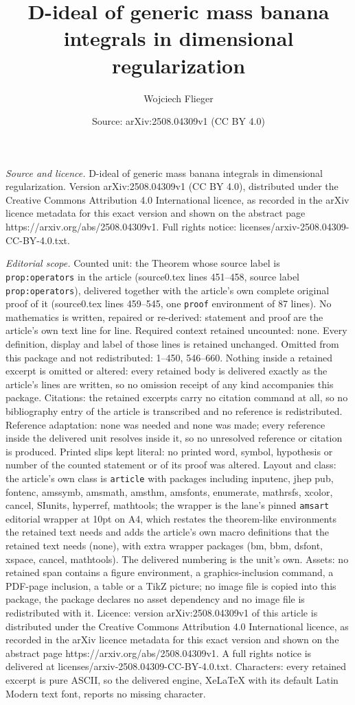 \documentclass[10pt,a4paper]{amsart}
\title[D-ideal of generic mass banana integrals in dimensional regu]{D-ideal of generic mass banana integrals in dimensional regularization}
\author{Wojciech Flieger}
\date{Source: arXiv:2508.04309v1 (CC BY 4.0)}
\begin{document}
\maketitle

\noindent\emph{Source and licence.} D-ideal of generic mass banana integrals in dimensional regularization. Version arXiv:2508.04309v1 (CC BY 4.0), distributed under the Creative Commons Attribution 4.0 International licence, as recorded in the arXiv licence metadata for this exact version and shown on the abstract page https://arxiv.org/abs/2508.04309v1. Full rights notice: licenses/arxiv-2508.04309-CC-BY-4.0.txt.\par\smallskip

\noindent\textit{Editorial scope.} Counted unit: the Theorem whose source label is \texttt{prop:operators} in the article (source0.tex lines 451--458, source label \texttt{prop:operators}), delivered together with the article's own complete original proof of it (source0.tex lines 459--545, one \texttt{proof} environment of 87 lines). No mathematics is written, repaired or re-derived: statement and proof are the article's own text line for line. Required context retained uncounted: none. Every definition, display and label of those lines is retained unchanged. Omitted from this package and not redistributed: 1--450, 546--660. Nothing inside a retained excerpt is omitted or altered: every retained body is delivered exactly as the article's lines are written, so no omission receipt of any kind accompanies this package. Citations: the retained excerpts carry no citation command at all, so no bibliography entry of the article is transcribed and no reference is redistributed. Reference adaptation: none was needed and none was made; every reference inside the delivered unit resolves inside it, so no unresolved reference or citation is produced. Printed slips kept literal: no printed word, symbol, hypothesis or number of the counted statement or of its proof was altered. Layout and class: the article's own class is \texttt{article} with packages including inputenc, jhep pub, fontenc, amssymb, amsmath, amsthm, amsfonts, enumerate, mathrsfs, xcolor, cancel, SIunits, hyperref, mathtools; the wrapper is the lane's pinned \texttt{amsart} editorial wrapper at 10pt on A4, which restates the theorem-like environments the retained text needs and adds the article's own macro definitions that the retained text needs (none), with extra wrapper packages (bm, bbm, dsfont, xspace, cancel, mathtools). The delivered numbering is the unit's own. Assets: no retained span contains a figure environment, a graphics-inclusion command, a PDF-page inclusion, a table or a TikZ picture; no image file is copied into this package, the package declares no asset dependency and no image file is redistributed with it. Licence: version arXiv:2508.04309v1 of this article is distributed under the Creative Commons Attribution 4.0 International licence, as recorded in the arXiv licence metadata for this exact version and shown on the abstract page https://arxiv.org/abs/2508.04309v1. A full rights notice is delivered at licenses/arxiv-2508.04309-CC-BY-4.0.txt. Characters: every retained excerpt is pure ASCII, so the delivered engine, XeLaTeX with its default Latin Modern text font, reports no missing character.
\end{document}
